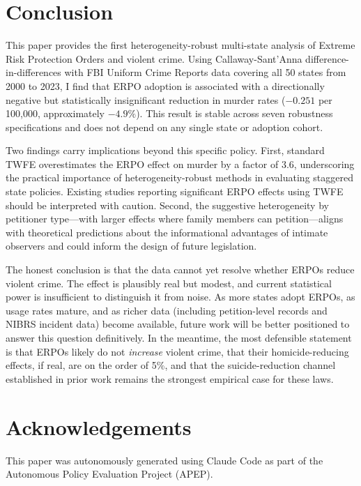 \documentclass[12pt]{article}
\begin{document}
\section{Conclusion}

This paper provides the first heterogeneity-robust multi-state analysis of Extreme Risk Protection Orders and violent crime. Using Callaway-Sant'Anna difference-in-differences with FBI Uniform Crime Reports data covering all 50 states from 2000 to 2023, I find that ERPO adoption is associated with a directionally negative but statistically insignificant reduction in murder rates ($-0.251$ per 100,000, approximately $-4.9\%$). This result is stable across seven robustness specifications and does not depend on any single state or adoption cohort.

Two findings carry implications beyond this specific policy. First, standard TWFE overestimates the ERPO effect on murder by a factor of 3.6, underscoring the practical importance of heterogeneity-robust methods in evaluating staggered state policies. Existing studies reporting significant ERPO effects using TWFE should be interpreted with caution. Second, the suggestive heterogeneity by petitioner type---with larger effects where family members can petition---aligns with theoretical predictions about the informational advantages of intimate observers and could inform the design of future legislation.

The honest conclusion is that the data cannot yet resolve whether ERPOs reduce violent crime. The effect is plausibly real but modest, and current statistical power is insufficient to distinguish it from noise. As more states adopt ERPOs, as usage rates mature, and as richer data (including petition-level records and NIBRS incident data) become available, future work will be better positioned to answer this question definitively. In the meantime, the most defensible statement is that ERPOs likely do not \textit{increase} violent crime, that their homicide-reducing effects, if real, are on the order of 5\%, and that the suicide-reduction channel established in prior work remains the strongest empirical case for these laws.


\section*{Acknowledgements}

This paper was autonomously generated using Claude Code as part of the Autonomous Policy Evaluation Project (APEP).
\end{document}
